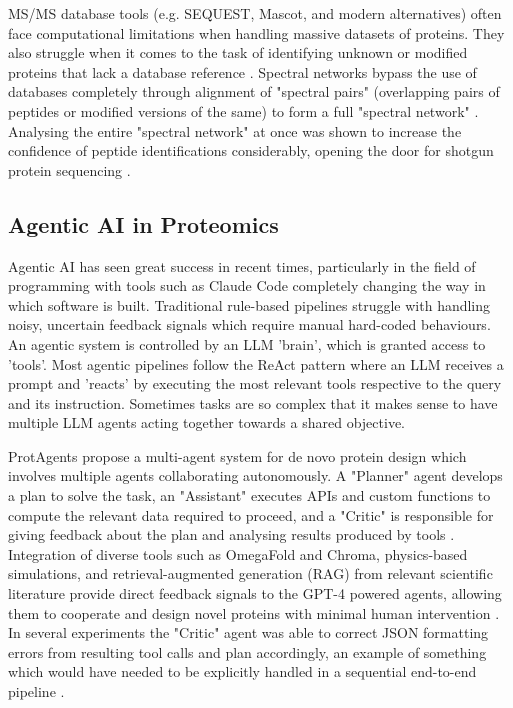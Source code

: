 \documentclass[journal]{IEEEtran}
\begin{document}
MS/MS database tools (e.g. SEQUEST, Mascot, and modern alternatives) often face computational
limitations when handling massive datasets of proteins. They also struggle when it comes to 
the task of identifying unknown or modified proteins that lack a database reference \cite{doi:10.1073/pnas.0701130104}.
Spectral networks bypass the use of databases completely through alignment of "spectral pairs"
(overlapping pairs of peptides or modified versions of the same) to form a full "spectral network" \cite{doi:10.1073/pnas.0701130104}.
Analysing the entire "spectral network" at once was shown to increase the confidence of peptide identifications
considerably, opening the door for shotgun protein sequencing \cite{doi:10.1073/pnas.0701130104}.

\subsection{Agentic AI in Proteomics}
Agentic AI has seen great success in recent times, particularly in the field of programming with tools
such as Claude Code completely changing the way in which software is built. Traditional rule-based pipelines struggle with handling noisy, uncertain feedback signals
which require manual hard-coded behaviours. An agentic system is controlled by an LLM 'brain', which is granted access to 'tools'. Most agentic pipelines follow the ReAct pattern
where an LLM receives a prompt and 'reacts' by executing the most relevant tools respective to the query
and its instruction. Sometimes tasks are so complex that it makes sense to have multiple LLM agents acting together towards a shared
objective. 

ProtAgents propose a multi-agent system for de novo protein design which involves multiple
agents collaborating autonomously. A "Planner" agent develops a plan to solve the task, an "Assistant"
executes APIs and custom functions to compute the relevant data required to proceed, and a "Critic" is
responsible for giving feedback about the plan and analysing results produced by tools 
\cite{ghafarollahi2024protagentsproteindiscoverylarge}. Integration of diverse tools such as
OmegaFold and Chroma, physics-based simulations, and retrieval-augmented generation (RAG) from
relevant scientific literature provide direct feedback signals to the GPT-4 powered agents, 
allowing them to cooperate and design novel proteins with minimal human intervention \cite{ghafarollahi2024protagentsproteindiscoverylarge}.
In several experiments the "Critic" agent was able to correct JSON formatting errors from resulting tool
calls and plan accordingly, an example of something which would have needed to be explicitly handled in a sequential
end-to-end pipeline \cite{ghafarollahi2024protagentsproteindiscoverylarge}.
\end{document}

